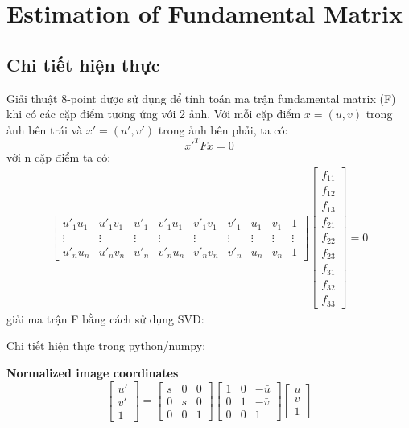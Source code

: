 \documentclass[11pt]{article}
\begin{document}
\section*{Estimation of Fundamental Matrix}
\subsection*{Chi tiết hiện thực}

Giải thuật 8-point được sử dụng để tính toán ma trận fundamental matrix (F) khi có các cặp điểm tương ứng với 2 ảnh. Với mỗi cặp điểm $x=(u, v)$ trong ảnh bên trái và $x'= (u',v')$ trong ảnh bên phải, ta có:
\begin{equation*}
    x'^T F x = 0
\end{equation*}
với n cặp điểm ta có:
\begin{align*}
    \begin{bmatrix}
        u'_1u_1 & u'_1v_1 & u'_1 & v'_1u_1 & v'_1v_1 & v'_1 & u_1 & v_1 & 1 \\
        \vdots & \vdots & \vdots & \vdots & \vdots & \vdots & \vdots & \vdots & \vdots \\
        u'_nu_n & u'_nv_n & u'_n & v'_nu_n & v'_nv_n & v'_n & u_n & v_n & 1
    \end{bmatrix}
    \begin{bmatrix}
        f_{11} \\
        f_{12} \\
        f_{13} \\
        f_{21} \\
        f_{22} \\
        f_{23} \\
        f_{31} \\
        f_{32} \\
        f_{33}
    \end{bmatrix}
    = 0
\end{align*}
giải ma trận F bằng cách sử dụng SVD:

Chi tiết hiện thực trong python/numpy:

\textbf{Normalized image coordinates}
\begin{equation*}
    \begin{bmatrix}
        u' \\
        v' \\
        1
    \end{bmatrix}
    =
    \begin{bmatrix}
        s & 0 & 0 \\
        0 & s & 0 \\
        0 & 0 & 1
    \end{bmatrix}
    \begin{bmatrix}
        1 & 0 & -\bar{u} \\
        0 & 1 & -\bar{v} \\
        0 & 0 & 1
    \end{bmatrix}
    \begin{bmatrix}
        u \\
        v \\
        1
    \end{bmatrix}
\end{equation*}
\end{document}
